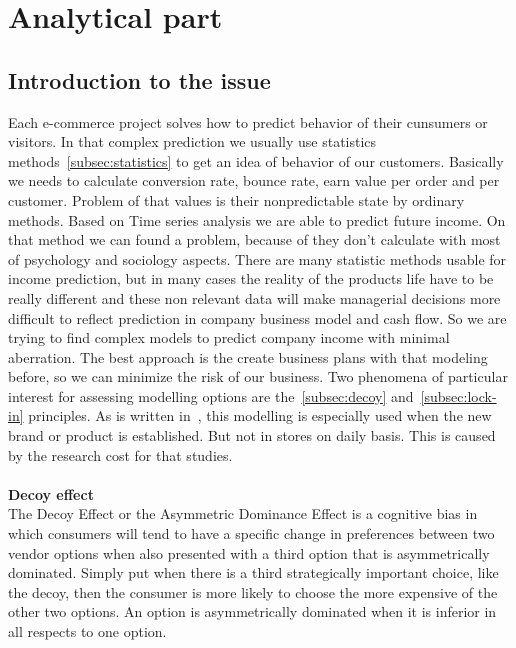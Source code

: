 
\chapter{Analytical part} \label{sec:analytical}

\section{Introduction to the issue} \label{sec:description}
Each e-commerce project solves how to predict behavior of their cunsumers or visitors.
In that complex prediction we usually use statistics methods~\ref{subsec:statistics} to get an idea of behavior of our customers. Basically we needs to calculate conversion rate, bounce rate, earn value per order and per customer. Problem of that values is their nonpredictable state by ordinary methods. Based on Time series analysis we are able to predict future income. On that method we can found a problem, because of they don't calculate with most of psychology and sociology aspects.
There are many statistic methods usable for income prediction, but in many cases the reality
of the products life have to be really different and these non relevant data will make managerial decisions more difficult to reflect prediction in company business model and cash flow.
So we are trying to find complex models to predict company income with minimal aberration.
The best approach is the create business plans with that modeling before, so we can minimize the risk of our business.
Two phenomena of particular interest for assessing modelling options are the~\ref{subsec:decoy} and~\ref{subsec:lock-in} principles.
As is written in~\cite{patel}, this modelling is especially used when the new brand or product is established.
But not in stores on daily basis.
This is caused by the research cost for that studies.\\
\\
\textbf{Decoy effect} \label{subsec:decoy}\\
The Decoy Effect or the Asymmetric Dominance Effect is a cognitive bias in which consumers will tend to have a specific
change in preferences between two vendor options when also presented with a third option that is asymmetrically dominated.
Simply put when there is a third strategically important choice, like the decoy, then the consumer is more likely to choose the more expensive of the other two options.
An option is asymmetrically dominated when it is inferior in all respects to one option.
